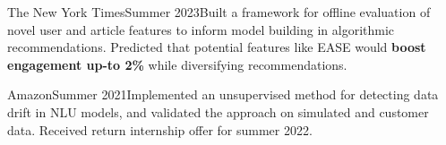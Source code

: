   {The New York Times}{Summer 2023}{}{Built a framework for offline evaluation of novel user and article features to inform model building in algorithmic recommendations. Predicted that potential features like EASE would \textbf{boost engagement up-to 2\%} while diversifying recommendations.}


  {Amazon}{Summer 2021}{}{Implemented an unsupervised method for detecting data drift in NLU models, and validated the approach on simulated and customer data. Received return internship offer for summer 2022.}
